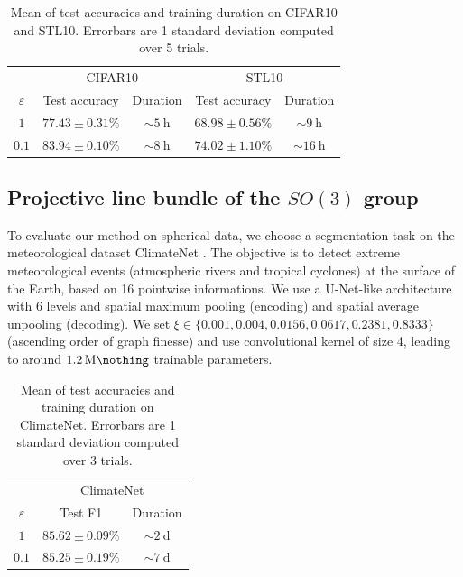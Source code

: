 \documentclass{article}
\begin{document}
\begin{table}[h!]
\centering 
\caption{Mean of test accuracies and training duration on CIFAR10 and STL10. Errorbars are 1 standard deviation computed over 5 trials.}
\begin{tabular}{c c c c c}
\toprule
 & \multicolumn{2}{c}{CIFAR10} & \multicolumn{2}{c}{STL10} \\
$\varepsilon$ & Test accuracy & Duration & Test accuracy & Duration \\
\midrule
$1$ & $77.43 \pm 0.31 \%$ & $\sim \SI{5}{\hour}$ & $68.98 \pm 0.56 \%$ & $\sim \SI{9}{\hour}$ \\
$0.1$ & $\boldsymbol{83.94 \pm 0.10 \%}$ & $\sim \SI{8}{\hour}$ & $\boldsymbol{74.02 \pm 1.10 \%}$ & $\sim \SI{16}{\hour}$ \\
\bottomrule
\end{tabular}
\end{table}

\subsection{Projective line bundle of the $SO(3)$ group}

To evaluate our method on spherical data, we choose a segmentation task on the meteorological dataset ClimateNet \citep{kashinath2021climatenet}. The objective is to detect extreme meteorological events (atmospheric rivers and tropical cyclones) at the surface of the Earth, based on 16 pointwise informations. We use a U-Net-like architecture \citep{ronneberger2015u} with 6 levels and spatial maximum pooling (encoding) and spatial average unpooling (decoding). We set $\xi \in \{0.001, 0.004, 0.0156, 0.0617, 0.2381, 0.8333\}$ (ascending order of graph finesse) and use convolutional kernel of size 4, leading to around $\SI{1.2}{\mega \nothing}$ trainable parameters. 

\begin{table}[h!]
\centering 
\caption{Mean of test accuracies and training duration on ClimateNet. Errorbars are 1 standard deviation computed over 3 trials.}
\begin{tabular}{c c c}
\toprule
 & \multicolumn{2}{c}{ClimateNet} \\
$\varepsilon$ & Test F1 & Duration \\
\midrule
$1$ & $\boldsymbol{85.62 \pm 0.09 \%}$ & $\sim \SI{2}{\day}$ \\
$0.1$ & $85.25 \pm 0.19 \%$ & $\sim \SI{7}{\day}$ \\
\bottomrule
\end{tabular}
\end{table}
\end{document}
